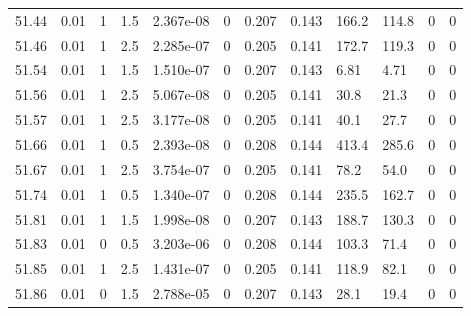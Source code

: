 \documentclass[preview]{standalone}
\begin{document}
{{{{{{{{{{{{{{{{\begin{tabular}{L{1.2cm}C{1.2cm} C{0.3cm}C{0.5cm} C{1.4cm}C{1.4cm} C{1.4cm}C{1.4cm} C{1.6cm}C{1.6cm} C{1.6cm}C{1.6cm}}
  51.44  &  0.01  & 1     & 1.5 &  2.367e-08  & 0  &  0.207&   0.143& 166.2 & 114.8   &  0 & 0  \\ 
  51.46  &  0.01  & 1     & 2.5 &  2.285e-07  & 0  &  0.205&   0.141& 172.7 & 119.3   &  0 & 0  \\ 
  51.54  &  0.01  & 1     & 1.5 &  1.510e-07  & 0  &  0.207&   0.143& 6.81 & 4.71   &  0 & 0  \\ 
  51.56  &  0.01  & 1     & 2.5 &  5.067e-08  & 0  &  0.205&   0.141& 30.8 & 21.3   &  0 & 0  \\ 
  51.57  &  0.01  & 1     & 2.5 &  3.177e-08  & 0  &  0.205&   0.141& 40.1 & 27.7   &  0 & 0  \\ 
  51.66  &  0.01  & 1     & 0.5 &  2.393e-08  & 0  &  0.208&   0.144& 413.4 & 285.6   &  0 & 0  \\ 
  51.67  &  0.01  & 1     & 2.5 &  3.754e-07  & 0  &  0.205&   0.141& 78.2 & 54.0   &  0 & 0  \\ 
  51.74  &  0.01  & 1     & 0.5 &  1.340e-07  & 0  &  0.208&   0.144& 235.5 & 162.7   &  0 & 0  \\ 
  51.81  &  0.01  & 1     & 1.5 &  1.998e-08  & 0  &  0.207&   0.143& 188.7 & 130.3   &  0 & 0  \\ 
  51.83  &  0.01  & 0     & 0.5 &  3.203e-06  & 0  &  0.208&   0.144& 103.3 & 71.4   &  0 & 0  \\ 
  51.85  &  0.01  & 1     & 2.5 &  1.431e-07  & 0  &  0.205&   0.141& 118.9 & 82.1   &  0 & 0  \\ 
  51.86  &  0.01  & 0     & 1.5 &  2.788e-05  & 0  &  0.207&   0.143& 28.1 & 19.4   &  0 & 0  \\ 
\hline 
\end{tabular} 

}}}}}}}}}}}}}}}}
\end{document}
